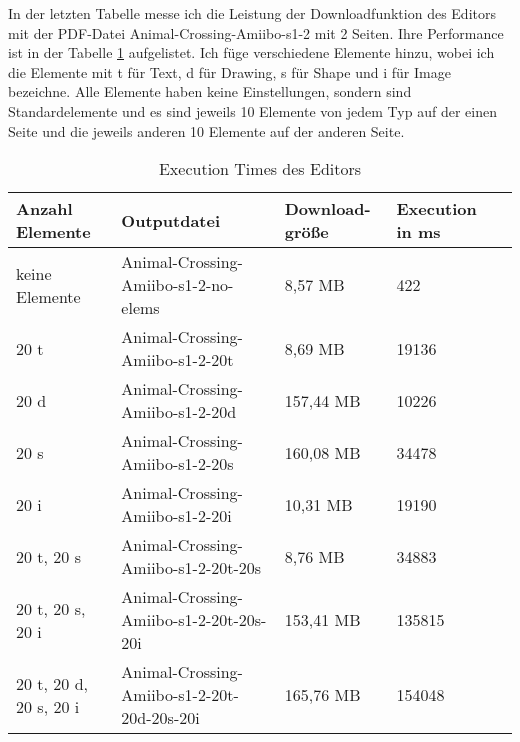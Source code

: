 In der letzten Tabelle messe ich die Leistung der Downloadfunktion des Editors mit der PDF-Datei Animal-Crossing-Amiibo-s1-2 mit 2 Seiten. Ihre Performance ist in der Tabelle \ref{table:editor-dur} aufgelistet. Ich füge verschiedene Elemente hinzu, wobei ich die Elemente mit t für Text, d für Drawing, s für Shape und i für Image bezeichne. Alle Elemente haben keine Einstellungen, sondern sind Standardelemente und es sind jeweils 10 Elemente von jedem Typ auf der einen Seite und die jeweils anderen 10 Elemente auf der anderen Seite.

\begin{table}[!htbp]
	\centering
	\begin{tabular}{|p{2cm}|p{4cm}|p{2cm}|p{2cm}|p{2cm}|}
		\hline
		\textbf{Anzahl Elemente}			& \textbf{Outputdatei}								& \textbf{Download-größe}	& \textbf{Execution in ms} 	\\ 
		\hline
		keine Elemente 								& Animal-Crossing-Amiibo-s1-2-no-elems		& 8,57 MB					& 422      					\\
		20 t 								& Animal-Crossing-Amiibo-s1-2-20t		& 8,69 MB					& 19136      					\\
		20 d 								& Animal-Crossing-Amiibo-s1-2-20d				& 157,44 MB					& 10226   					\\
		20 s 								& Animal-Crossing-Amiibo-s1-2-20s				& 160,08 MB					& 34478      					\\
		20 i 								& Animal-Crossing-Amiibo-s1-2-20i				& 10,31 MB					& 19190     					\\
		20 t, 20 s 						& Animal-Crossing-Amiibo-s1-2-20t-20s			& 8,76 MB					& 34883     					\\
		20 t, 20 s, 20 i 				& Animal-Crossing-Amiibo-s1-2-20t-20s-20i	& 153,41 MB					& 135815     					\\
		20 t, 20 d, 20 s, 20 i 			& Animal-Crossing-Amiibo-s1-2-20t-20d-20s-20i	& 165,76 MB					& 154048   					\\
		\hline
	\end{tabular}
	\caption{Execution Times des Editors}
	\label{table:editor-dur}
\end{table}